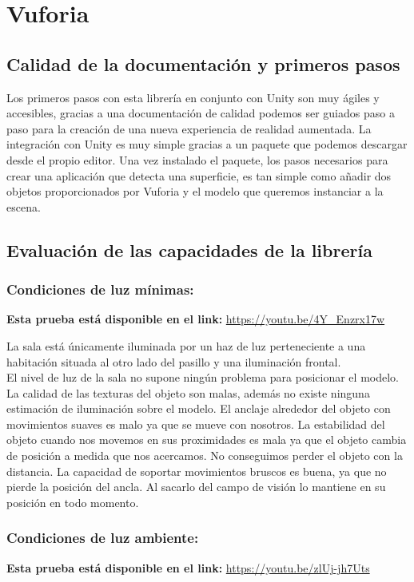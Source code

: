 \clearpage
\section{Vuforia}
\subsection{Calidad de la documentación y primeros pasos}
Los primeros pasos con esta librería en conjunto con Unity son muy ágiles y accesibles, gracias a una documentación de calidad podemos ser guiados paso a paso para la creación de una nueva experiencia de realidad aumentada. La integración con Unity es muy simple gracias a un paquete que podemos descargar desde el propio editor. Una vez instalado el paquete, los pasos necesarios para crear una aplicación que detecta una superficie, es tan simple como añadir dos objetos proporcionados por Vuforia y el modelo que queremos instanciar a la escena.


\subsection{Evaluación de las capacidades de la librería}
\subsubsection{Condiciones de luz mínimas:}
\textbf{Esta prueba está disponible en el link:} \url{https://youtu.be/4Y_Enzrx17w}

La sala está únicamente iluminada por un haz de luz perteneciente a una habitación situada al otro lado del pasillo y una iluminación frontal.\\

El nivel de luz de la sala no supone ningún problema para posicionar el modelo. La calidad de las texturas del objeto son malas, además no existe ninguna estimación de iluminación sobre el modelo. El anclaje alrededor del objeto con movimientos suaves es malo ya que se mueve con nosotros. La estabilidad del objeto cuando nos movemos en sus proximidades es mala ya que el objeto cambia de posición a medida que nos acercamos. No conseguimos perder el objeto con la distancia. La capacidad de soportar movimientos bruscos es buena, ya que no pierde la posición del ancla. Al sacarlo del campo de visión lo mantiene en su posición en todo momento.

\subsubsection{Condiciones de luz ambiente:\\}
\textbf{Esta prueba está disponible en el link:} \url{https://youtu.be/zlUj-jh7Uts}

